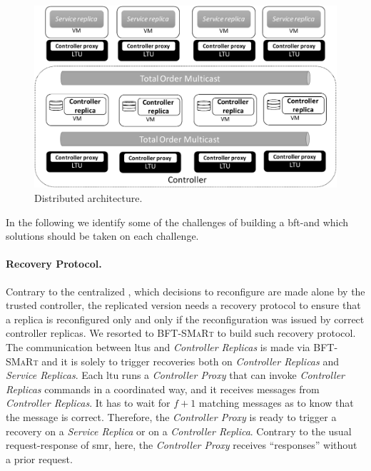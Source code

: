 \begin{figure}[h]
\begin{center}
\includegraphics[width=0.7\columnwidth]{images/images/lazarus_distributed.pdf}
\caption{Distributed \system architecture.}
\label{fig:lazarus_distributed}
\end{center}
\end{figure}

In the following we identify some of the challenges of building a \gls{bft}-\system and which solutions should be taken on each challenge.
 
\paragraph{Recovery Protocol.}
Contrary to the centralized \system, which decisions to reconfigure are made alone by the trusted controller, the replicated version needs a recovery protocol to ensure that a replica is reconfigured only and only if the reconfiguration was issued by correct controller replicas.
We resorted to \textsc{BFT-SMaRt} to build such recovery protocol.
The communication between \glspl{ltu} and \emph{Controller Replicas} is made via \textsc{BFT-SMaRt} and it is solely to trigger recoveries both on \emph{Controller Replicas} and \emph{Service Replicas}.
Each \gls{ltu} runs a \emph{Controller Proxy} that can invoke \emph{Controller Replicas} commands in a coordinated way, and it receives messages from \emph{Controller Replicas}.
It has to wait for $f+1$ matching messages as to know that the message is correct. 
Therefore, the \emph{Controller Proxy} is ready to trigger a recovery on a \emph{Service Replica} or on a \emph{Controller Replica}.
Contrary to the usual request-response of \gls{smr}, here, the \emph{Controller Proxy} receives ``responses'' without a prior request. 



